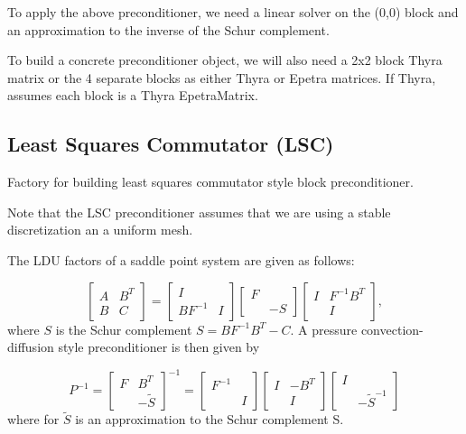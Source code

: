\documentclass[oneeqnum,onefignum,onetabnum,10pt]{SANDreport}
\begin{document}
To apply the above preconditioner, we need a linear solver on the
(0,0) block and an approximation to the inverse of the Schur
complement.

To build a concrete preconditioner object, we will also need a 2x2
block Thyra matrix or the 4 separate blocks as either Thyra or Epetra
matrices.  If Thyra, assumes each block is a Thyra EpetraMatrix.





\subsection{Least Squares Commutator (LSC)}
Factory for building least squares commutator style block
preconditioner.  

Note that the LSC preconditioner assumes that we are using
a stable discretization an a uniform mesh.

The LDU factors of a saddle point system are given as follows:

\begin{equation}
  \left[ \begin{array}{cc} A & B^T \\ B & C \end{array} \right]
     = \left[ \begin{array}{cc} I & \\ BF^{-1} & I \end{array} \right]
       \left[ \begin{array}{cc} F & \\  & -S \end{array} \right]
       \left[ \begin{array}{cc} I & F^{-1} B^T  \\  & I \end{array} \right],
\end{equation}
where $S$ is the Schur complement $S = B F^{-1} B^T - C$.
A pressure convection-diffusion style preconditioner is then given by
     
\begin{equation}
     P^{-1} =
       \left[ \begin{array}{cc} F & B^T \\ & -\tilde S \end{array} \right]^{-1}
       = 
       \left[ \begin{array}{cc} F^{-1} &  \\  & I \end{array} \right]
       \left[ \begin{array}{cc} I & -B^T \\  & I \end{array} \right]
       \left[ \begin{array}{cc} I &  \\  & -\tilde S^{-1} \end{array} \right]
\end{equation}
where for $\tilde S$ is an approximation to the Schur complement S.
\end{document}
